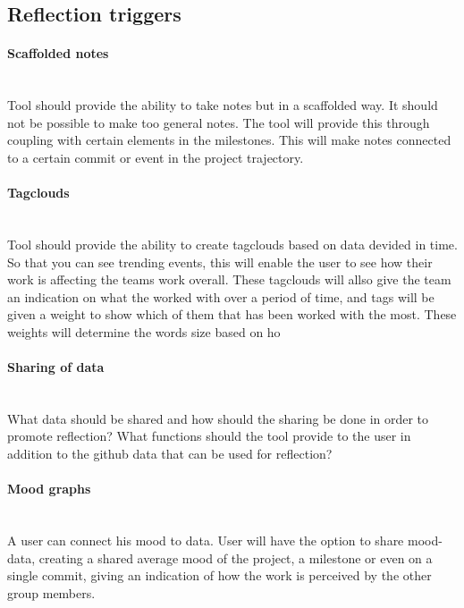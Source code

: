 \subsection{Reflection triggers}
\paragraph{Scaffolded notes}\mbox{}\\
Tool should provide the ability to take notes but in a scaffolded way. It should not be possible to make too general notes. The tool will provide this through coupling with certain elements in the milestones. This will make notes connected to a certain commit or event in the project trajectory. 

\paragraph{Tagclouds}\mbox{}\\
Tool should provide the ability to create tagclouds based on data devided in time. So that you can see trending events, this will enable the user to see how their work is affecting the teams work overall. These tagclouds will allso give the team an indication on what the worked with over a period of time, and tags will be given a weight to show which of them that has been worked with the most. These weights will determine the words size based on ho

\paragraph{Sharing of data}\mbox{}\\
What data should be shared and how should the sharing be done in order to promote reflection? What functions should the tool provide to the user in addition to the github data that can be used for reflection?

\paragraph{Mood graphs}\mbox{}\\
A user can connect his mood to data. 
User will have the option to share mood-data, creating a shared average mood of the project, a milestone or even on a single commit, giving an indication of how the work is perceived by the other group members. 
